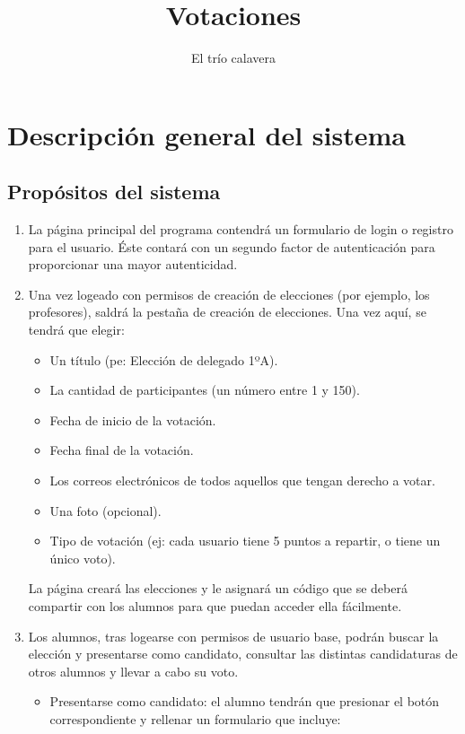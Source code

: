 \documentclass{article}
\title{Votaciones}
\author{El trío calavera}
\begin{document}
\maketitle

\tableofcontents
\newpage

\section{Descripción general del sistema}
    \subsection{Propósitos del sistema}
    \begin{enumerate}
        \item La página principal del programa contendrá un formulario de login o registro para el usuario. Éste contará con un segundo factor de autenticación para proporcionar una mayor autenticidad.
        \item Una vez logeado con permisos de creación de elecciones (por ejemplo, los profesores),  saldrá la pestaña de creación de elecciones. Una vez aquí, se tendrá que elegir:
        \begin{itemize}
            \item Un título (pe: Elección de delegado 1ºA).
            \item La cantidad de participantes (un número entre 1 y 150).
            \item Fecha de inicio de la votación.
            \item Fecha final de la votación.
            \item Los correos electrónicos de todos aquellos que tengan derecho a votar.
            \item Una foto (opcional).
            \item Tipo de votación (ej: cada usuario tiene 5 puntos a repartir, o tiene un único voto).
        \end{itemize}
        La página creará las elecciones y le asignará un código que se deberá compartir con los alumnos para que puedan acceder ella fácilmente.
        \item Los alumnos, tras logearse con permisos de usuario base, podrán buscar la elección y presentarse como candidato, consultar las distintas 
        candidaturas de otros alumnos y llevar a cabo su voto.
        \begin{itemize}
            \item Presentarse como candidato: el alumno tendrán que presionar el botón correspondiente y rellenar un formulario que incluye:

\end{itemize}
\end{enumerate}
\end{document}
